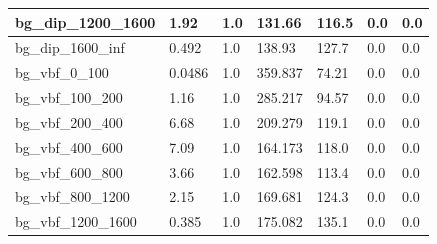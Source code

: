 \documentclass[a4paper, 10pt]{article}
\begin{document}
\begin{table}[H]
\begin{center}
\begin{tabular}{|m{23.0mm}|m{23.0mm}|m{18.0mm}|m{19.0mm}|m{19.0mm}|m{19.0mm}|m{19.0mm}|}
      \hline
      {\cellcolor{white}         bg\_dip\_1200\_1600}& {\cellcolor{white}         1.92}& {\cellcolor{white}         1.0}& {\cellcolor{white}         131.66}& {\cellcolor{white}         116.5}& {\cellcolor{green}         0.0}& {\cellcolor{green}         0.0}\\
      \hline
      {\cellcolor{white}         bg\_dip\_1600\_inf}& {\cellcolor{white}         0.492}& {\cellcolor{white}         1.0}& {\cellcolor{white}         138.93}& {\cellcolor{white}         127.7}& {\cellcolor{green}         0.0}& {\cellcolor{green}         0.0}\\
      \hline
      {\cellcolor{white}         bg\_vbf\_0\_100}& {\cellcolor{white}         0.0486}& {\cellcolor{white}         1.0}& {\cellcolor{white}         359.837}& {\cellcolor{white}         74.21}& {\cellcolor{green}         0.0}& {\cellcolor{green}         0.0}\\
      \hline
      {\cellcolor{white}         bg\_vbf\_100\_200}& {\cellcolor{white}         1.16}& {\cellcolor{white}         1.0}& {\cellcolor{white}         285.217}& {\cellcolor{white}         94.57}& {\cellcolor{green}         0.0}& {\cellcolor{green}         0.0}\\
      \hline
      {\cellcolor{white}         bg\_vbf\_200\_400}& {\cellcolor{white}         6.68}& {\cellcolor{white}         1.0}& {\cellcolor{white}         209.279}& {\cellcolor{white}         119.1}& {\cellcolor{green}         0.0}& {\cellcolor{green}         0.0}\\
      \hline
      {\cellcolor{white}         bg\_vbf\_400\_600}& {\cellcolor{white}         7.09}& {\cellcolor{white}         1.0}& {\cellcolor{white}         164.173}& {\cellcolor{white}         118.0}& {\cellcolor{green}         0.0}& {\cellcolor{green}         0.0}\\
      \hline
      {\cellcolor{white}         bg\_vbf\_600\_800}& {\cellcolor{white}         3.66}& {\cellcolor{white}         1.0}& {\cellcolor{white}         162.598}& {\cellcolor{white}         113.4}& {\cellcolor{green}         0.0}& {\cellcolor{green}         0.0}\\
      \hline
      {\cellcolor{white}         bg\_vbf\_800\_1200}& {\cellcolor{white}         2.15}& {\cellcolor{white}         1.0}& {\cellcolor{white}         169.681}& {\cellcolor{white}         124.3}& {\cellcolor{green}         0.0}& {\cellcolor{green}         0.0}\\
      \hline
      {\cellcolor{white}         bg\_vbf\_1200\_1600}& {\cellcolor{white}         0.385}& {\cellcolor{white}         1.0}& {\cellcolor{white}         175.082}& {\cellcolor{white}         135.1}& {\cellcolor{green}         0.0}& {\cellcolor{green}         0.0}\\

\end{tabular}
\end{center}
\end{table}
\end{document}
